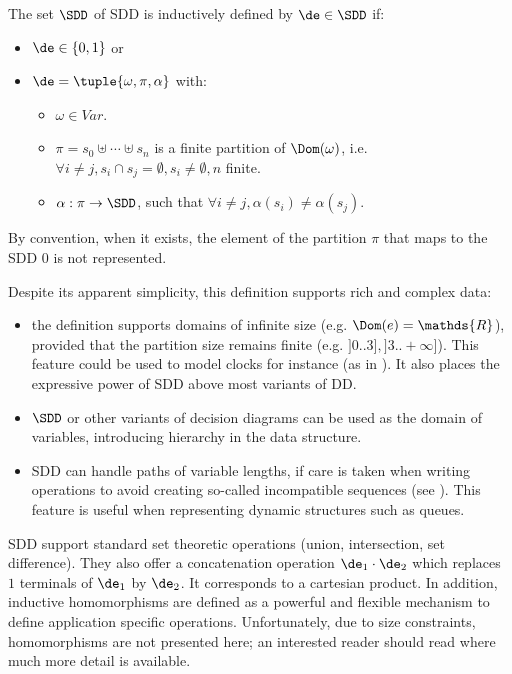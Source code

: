 \begin{definition}\label{SDD_Def}
The set $\SDD$ of SDD is inductively defined by $\de\in \SDD$ if:
\begin{itemize}
\item $\de \in \{0,1\}$ or
\item $\de=\tuple{\omega,\pi,\alpha}$ with:
 \begin{itemize}
    \item $\omega \in Var$.
    \item $\pi = s_0 \uplus \cdots \uplus s_n$ is a finite  partition of $\Dom(\omega)$,
    i.e. $\forall i\neq j, s_i\cap s_j=\emptyset, s_i\neq\emptyset, n$ finite.
    \item $\alpha : \pi \rightarrow \SDD$, such that $\forall i \neq j, \alpha(s_i) \neq \alpha(s_j)$.
\end{itemize}
\end{itemize}
By convention,
when it exists, the element of the partition $\pi$ that maps to the
SDD $0$ is not represented.
\end{definition}

Despite its apparent simplicity, this definition supports rich and
complex data:
\begin{itemize}
\item the definition supports domains of infinite size (e.g. $\Dom(e)
= \mathds{R}$), provided that the partition size remains finite
(e.g. $]0..3],]3..+\infty]$). This feature could be used to model
clocks for instance (as in \cite{WangIEEE04}). It also places the
expressive power of SDD above most variants of DD.
\item $\SDD$ or other variants of decision diagrams can be used as
 the domain of variables, introducing hierarchy in the data structure. 
\item SDD can handle paths of variable lengths, if care is taken when
writing operations to avoid creating so-called incompatible
sequences (see \cite{CT05a}). This feature is useful when
representing dynamic structures such as queues.
\end{itemize}

SDD support standard set theoretic operations (union, intersection,
set difference). They also offer a concatenation operation $\de_1
\cdot \de_2$ which replaces $1$ terminals of $\de_1$ by $\de_2$. It
corresponds to a cartesian product. In addition, inductive homomorphisms are
defined as a powerful and flexible mechanism to define application
specific operations. Unfortunately, due to size constraints,
homomorphisms are not presented here; an interested reader should read
\cite{atpn08saturation} where much more detail is available.

